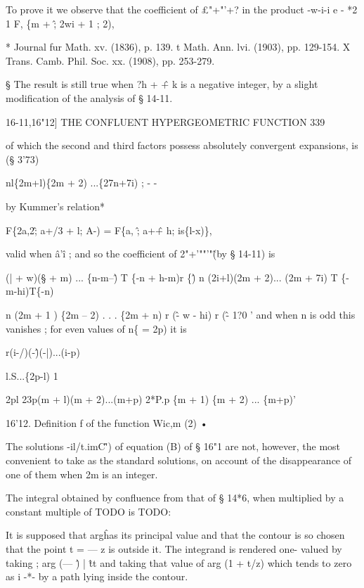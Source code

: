 To prove it we observe that the coefficient of £"+"'+? in the product 
-w-i-i e - *2 1 F, \{m + \^ ; 2wi + 1 ; 2), 

* Journal fur Math. xv. (1836), p. 139. 
t Math. Ann. lvi. (1903), pp. 129-154. 
X Trans. Camb. Phil. Soc. xx. (1908), pp. 253-279. 

§ The result is still true when ?h + \^ + k is a negative integer, by a slight modification of the 
analysis of § 14-11. 



16-11,16"12] THE CONFLUENT HYPERGEOMETRIC FUNCTION 339 

of which the second and third factors possess absolutely convergent expansions, is (§ 3'73) 






nl\{2m+l)\{2m + 2) ...\{27n+7i) ; - - 

by Kummer's relation* 

F\{2a,2\^; a+/3 + l; A-) = F\{a, \^; a+\^ + h; is\{l-x)\}, 

valid when \^a'\^ i ; and so the coefficient of 2"+'""'"\^ (by § 14-11) is 

(| + w)(§ + m) ... \{n-m--\^ ) T \{-n + h-m)r \{\^ ) 
n (2i+l)(2m + 2)... (2m + 7i) T \{-m-hi)T\{-n) 

n (2m + 1 ) \{2m -- 2) . . . \{2m + n) r (\^ - w - hi) r (\^ - 1?0 ' 
and when n is odd this vanishes ; for even values of n\{ = 2p) it is 

r(i-/)(-\^)(-|)...(i-p) 



l.S...\{2p-l) 1 



2pl 23p(m + l)(m + 2)...(m+p) 2*P.p \{m + 1) \{m + 2) ... \{m+p)' 

16'12. Definition f of the function Wic,m (2) • 

The solutions -il/t.imC\^') of equation (B) of § 16"1 are not, however, the 
most convenient to take as the standard solutions, on account of the 
disappearance of one of them when 2m is an integer. 

The integral obtained by confluence from that of § 14*6, when multiplied 
by a constant multiple of TODO is TODO: 

It is supposed that arg\^ has its principal value and that the contour is so 
chosen that the point t = — z is outside it. The integrand is rendered one- 
valued by taking ; arg (— \^) | \^ tt and taking that value of arg (1 + t/z) which 
tends to zero as i -*- by a path lying inside the contour. 

